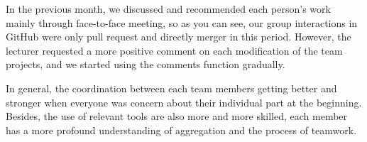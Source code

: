 \noindent In the previous month, we discussed and recommended each person's work mainly through face-to-face meeting, so as you can see, our group interactions in GitHub were only pull request and directly merger in this period. However, the lecturer requested a more positive comment on each modification of the team projects, and we started using the comments function gradually.
\vspace{0.3cm}

\noindent In general, the coordination between each team members getting better and stronger when everyone was concern about their individual part at the beginning. Besides, the use of relevant tools are also more and more skilled, each member has a more profound understanding of aggregation and the process of teamwork.
